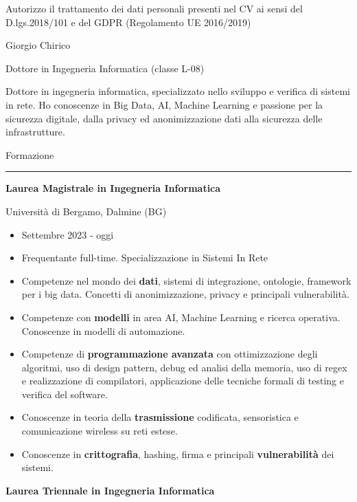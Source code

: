 \documentclass[a4paper]{letter}
\begin{document}
\begin{minipage}[t]{0.65\textwidth}
\setlength{\baselineskip}{1.4\baselineskip}

{\tiny Autorizzo il trattamento dei dati personali presenti nel CV ai sensi del D.lgs.2018/101 e del GDPR (Regolamento UE 2016/2019)}
\vspace{0.3cm}


{\huge Giorgio Chirico}

{\large Dottore in Ingegneria Informatica (classe L-08)}

\vspace{0.5cm}
 
Dottore in ingegneria informatica, specializzato nello sviluppo e verifica di sistemi in rete. Ho conoscenze in Big Data, AI, Machine Learning e passione per la sicurezza digitale, dalla privacy ed anonimizzazione dati alla sicurezza delle infrastrutture.


\vspace{0.5cm}

{\large Formazione}
\rule{\linewidth}{0.4pt}

{\large \textbf{Laurea Magistrale in Ingegneria Informatica}}

{\small Università di Bergamo, Dalmine (BG)}
\begin{itemize}
    \item Settembre 2023 - oggi
    \item Frequentante full-time. Specializzazione in Sistemi In Rete
\item Competenze nel mondo dei \textbf{dati}, sistemi di integrazione, ontologie, framework per i big data. Concetti di anonimizzazione, privacy e principali vulnerabilità.
\item Competenze con \textbf{modelli} in area AI, Machine Learning e ricerca operativa. Conoscenze in modelli di automazione. 
\item Competenze di \textbf{programmazione avanzata} con ottimizzazione degli algoritmi, uso di design pattern, debug ed analisi della memoria, uso di regex e realizzazione di compilatori, applicazione delle tecniche formali di testing e verifica del software.
\item Conoscenze in teoria della \textbf{trasmissione} codificata, sensoristica e comunicazione wireless su reti estese.
\item Conoscenze in \textbf{crittografia}, hashing, firma e principali \textbf{vulnerabilità} dei sistemi.\end{itemize}
{\large \textbf{Laurea Triennale in Ingegneria Informatica} }


\end{minipage}
\end{document}

